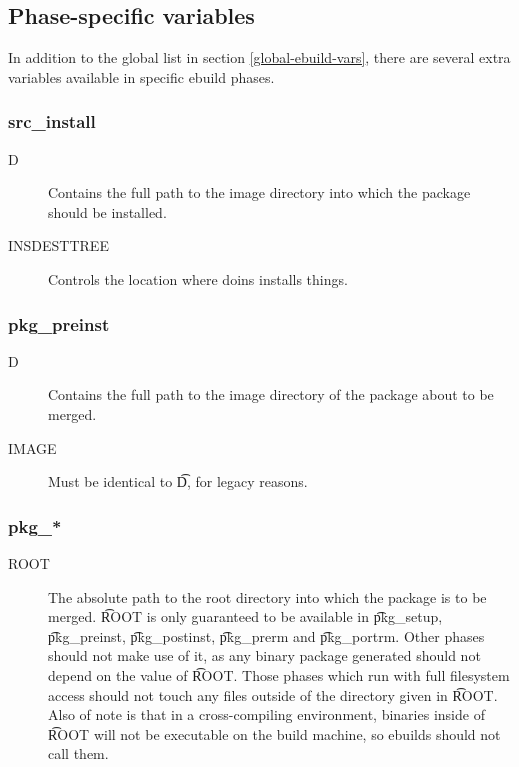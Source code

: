 
\subsection{Phase-specific variables}

In addition to the global list in section \ref{global-ebuild-vars}, there are several extra
variables available in specific ebuild phases.

\subsubsection{src\_install}
\begin{description}
\item[D] Contains the full path to the image directory into which the package should be installed.
\item[INSDESTTREE] Controls the location where doins installs things.
\end{description}

\subsubsection{pkg\_preinst}
\begin{description}
\item[D] Contains the full path to the image directory of the package about to be merged.
\item[IMAGE] Must be identical to \t{D}, for legacy reasons.
\end{description}

\subsubsection{pkg\_*}
\begin{description}
\item[ROOT] The absolute path to the root directory into which the package is to be merged. \t{ROOT}
    is only guaranteed to be available in \t{pkg\_setup}, \t{pkg\_preinst}, \t{pkg\_postinst},
    \t{pkg\_prerm} and \t{pkg\_portrm}. Other phases should not make use of it, as any binary
    package generated should not depend on the value of \t{ROOT}. Those phases which run with full
    filesystem access should not touch any files outside of the directory given in \t{ROOT}. Also of
    note is that in a cross-compiling environment, binaries inside of \t{ROOT} will not be
    executable on the build machine, so ebuilds should not call them.
\end{description}


